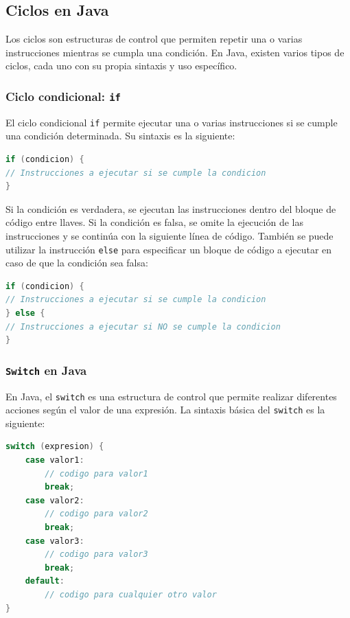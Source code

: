 \documentclass[executivepaper]{article}
\begin{document}
\subsection{Ciclos en Java}

Los ciclos son estructuras de control que permiten repetir una o varias instrucciones mientras se cumpla una condición. En Java, existen varios tipos de ciclos, cada uno con su propia sintaxis y uso específico.

\subsubsection{Ciclo condicional: \texttt{if}}

El ciclo condicional \texttt{if} permite ejecutar una o varias instrucciones si se cumple una condición determinada. Su sintaxis es la siguiente:

\begin{lstlisting}[language=Java]
if (condicion) {
// Instrucciones a ejecutar si se cumple la condicion
}
\end{lstlisting}
Si la condición es verdadera, se ejecutan las instrucciones dentro del bloque de código entre llaves. Si la condición es falsa, se omite la ejecución de las instrucciones y se continúa con la siguiente línea de código. También se puede utilizar la instrucción \texttt{else} para especificar un bloque de código a ejecutar en caso de que la condición sea falsa:

\begin{lstlisting}[language=Java]
if (condicion) {
// Instrucciones a ejecutar si se cumple la condicion
} else {
// Instrucciones a ejecutar si NO se cumple la condicion
}
\end{lstlisting}

\subsubsection{\texttt{Switch} en Java}

En Java, el \texttt{switch} es una estructura de control que permite realizar diferentes acciones según el valor de una expresión. La sintaxis básica del \texttt{switch} es la siguiente:

\begin{lstlisting}[language=Java]
switch (expresion) {
    case valor1:
        // codigo para valor1
        break;
    case valor2:
        // codigo para valor2
        break;
    case valor3:
        // codigo para valor3
        break;
    default:
        // codigo para cualquier otro valor
}
\end{lstlisting}
\end{document}
